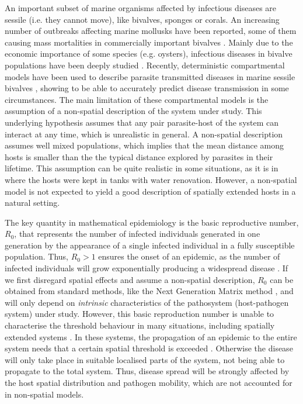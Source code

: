 An important subset of marine organisms affected by infectious diseases are
sessile (i.e. they cannot move), like bivalves, sponges or corals. An
increasing number of outbreaks affecting marine mollusks have been reported,
some of them causing mass mortalities in commercially important bivalves
\cite{Guo2016}. Mainly due to the economic importance of some species (e.g.
oysters), infectious diseases in bivalve populations have been deeply studied
\cite{Petton2021, Pernet2018, McLaughlin2005, powell1999modeling}. Recently,
deterministic compartmental models have been used to describe parasite
transmitted diseases in marine sessile bivalves \cite{BIDEGAIN_2016_2,
    BIDEGAIN_perkinsus, GimenezRomero2021}, showing to be able to accurately
predict disease transmission in some circumstances. The main limitation of
these compartmental models is the assumption of a non-spatial description of
the system under study. This underlying hypothesis assumes that any pair
parasite-host of the system can interact at any time, which is unrealistic in
general. A non-spatial description assumes well mixed populations, which
implies that the mean distance among hosts is smaller than the the typical
distance explored by parasites in their lifetime. This assumption can be quite
realistic in some situations, as it is in \cite{GimenezRomero2021} where the
hosts were kept in tanks with water renovation. However, a non-spatial model is
not expected to yield a good description of spatially extended hosts in a
natural setting.

The key quantity in mathematical epidemiology is the basic reproductive number,
$R_0$, that represents the number of infected individuals generated in one
generation by the appearance of a single infected individual in a fully
susceptible population. Thus, $R_0>1$ ensures the onset of an epidemic, as the
number of infected individuals will grow exponentially	producing a widespread
disease \cite{Anderson1991}. If we first disregard spatial effects and assume a
non-spatial description, $R_0$ can be obtained from standard methods, like the
Next Generation Matrix method \cite{Diekmann2010}, and will only depend on
\textit{intrinsic} characteristics of the pathosystem (host-pathogen system)
under study. However, this basic reproduction number is unable to characterise
the threshold behaviour in many situations, including spatially extended
systems \cite{Cross2007, Li2011, RILEY201568}. In these systems, the
propagation of an epidemic to the entire system needs that a certain spatial
threshold is exceeded \cite{Gilligan2008}. Otherwise the disease will only take
place in suitable localised parts of the system, not being able to propagate to
the total system. Thus, disease spread will be strongly affected by the host
spatial distribution and pathogen mobility, which are not accounted for in
non-spatial models.


